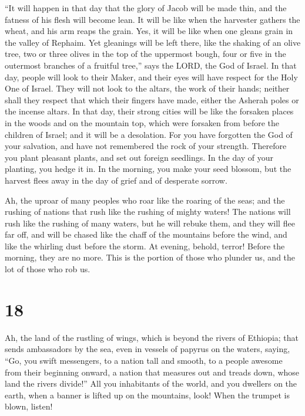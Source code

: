  ``It will happen in that day that the glory of Jacob will
be made thin, and the fatness of his flesh will become lean.
 It will be like when the harvester gathers the wheat, and
his arm reaps the grain. Yes, it will be like when one gleans grain in
the valley of Rephaim.  Yet gleanings will be left there,
like the shaking of an olive tree, two or three olives in the top of the
uppermost bough, four or five in the outermost branches of a fruitful
tree,'' says the LORD, the God of Israel.  In that day,
people will look to their Maker, and their eyes will have respect for
the Holy One of Israel.  They will not look to the altars,
the work of their hands; neither shall they respect that which their
fingers have made, either the Asherah poles or the incense altars.
 In that day, their strong cities will be like the
forsaken places in the woods and on the mountain top, which were
forsaken from before the children of Israel; and it will be a
desolation.  For you have forgotten the God of your
salvation, and have not remembered the rock of your strength. Therefore
you plant pleasant plants, and set out foreign seedlings.
 In the day of your planting, you hedge it in. In the
morning, you make your seed blossom, but the harvest flees away in the
day of grief and of desperate sorrow.

 Ah, the uproar of many peoples who roar like the roaring
of the seas; and the rushing of nations that rush like the rushing of
mighty waters!  The nations will rush like the rushing of
many waters, but he will rebuke them, and they will flee far off, and
will be chased like the chaff of the mountains before the wind, and like
the whirling dust before the storm.  At evening, behold,
terror! Before the morning, they are no more. This is the portion of
those who plunder us, and the lot of those who rob us.

\hypertarget{section-17}{%
\section{18}\label{section-17}}

 Ah, the land of the rustling of wings, which is beyond
the rivers of Ethiopia;  that sends ambassadors by the
sea, even in vessels of papyrus on the waters, saying, ``Go, you swift
messengers, to a nation tall and smooth, to a people awesome from their
beginning onward, a nation that measures out and treads down, whose land
the rivers divide!''  All you inhabitants of the world,
and you dwellers on the earth, when a banner is lifted up on the
mountains, look! When the trumpet is blown, listen!

